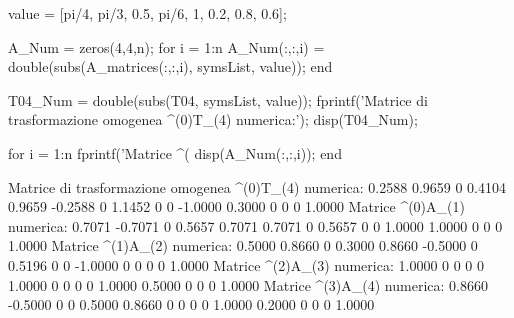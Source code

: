 \documentclass[11pt, a4paper]{article}
\begin{document}
\begin{matlabcode}

value = [pi/4, pi/3, 0.5, pi/6, 1, 0.2, 0.8, 0.6];

A_Num = zeros(4,4,n);
for i = 1:n
    A_Num(:,:,i) = double(subs(A_matrices(:,:,i), symsList, value));
end

T04_Num = double(subs(T04, symsList, value));
fprintf('Matrice di trasformazione omogenea ^(0)T_(4) numerica:\n');
disp(T04_Num);

for i = 1:n
    fprintf('Matrice ^(%
    disp(A_Num(:,:,i));
end
\end{matlabcode}
\begin{matlaboutput}
Matrice di trasformazione omogenea ^(0)T_(4) numerica:
    0.2588    0.9659         0    0.4104
    0.9659   -0.2588         0    1.1452
         0         0   -1.0000    0.3000
         0         0         0    1.0000
Matrice ^(0)A_(1) numerica:
    0.7071   -0.7071         0    0.5657
    0.7071    0.7071         0    0.5657
         0         0    1.0000    1.0000
         0         0         0    1.0000
Matrice ^(1)A_(2) numerica:
    0.5000    0.8660         0    0.3000
    0.8660   -0.5000         0    0.5196
         0         0   -1.0000         0
         0         0         0    1.0000
Matrice ^(2)A_(3) numerica:
    1.0000         0         0         0
         0    1.0000         0         0
         0         0    1.0000    0.5000
         0         0         0    1.0000
Matrice ^(3)A_(4) numerica:
    0.8660   -0.5000         0         0
    0.5000    0.8660         0         0
         0         0    1.0000    0.2000
         0         0         0    1.0000
\end{matlaboutput}

\newpage
{}
\end{document}
